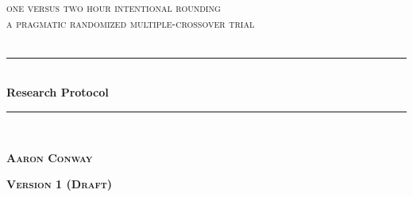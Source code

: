 \documentclass[12pt]{article}
\begin{document}
\begin{titlepage}

\newcommand{\HRule}{\rule{\linewidth}{0.5mm}} %

\center %
 

\textsc{\LARGE one versus two hour intentional rounding}\\[1.5cm] %
\textsc{\Large a pragmatic randomized multiple-crossover trial}\\[0.5cm] %
\textsc{\large }\\[0.5cm] %


\HRule \\[0.6cm]
{ \huge \bfseries Research Protocol}\\[0.4cm] %
\HRule \\[1.0cm]
 

\begin{center} \large
\medskip
{\textsc{\textbf{Aaron Conway} }}     %
\end{center}

\begin{center} \Large
{\textsc{\textbf{Version 1 (Draft)} }} 
\end{center}

~


\end{titlepage}
\end{document}
